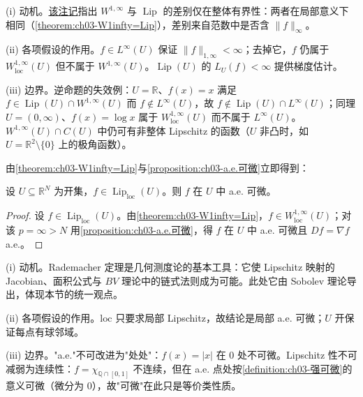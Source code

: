 \documentclass[../../main.tex]{subfiles}%
\begin{document}
\begin{remark}\label{remark:ch03-Lip含W1infty动机}
(i) 动机。\hyperref[remark:ch03-Lip含W1infty]{该注记}指出 $W^{1,\infty}$ 与 $\operatorname{Lip}$ 的差别仅在整体有界性：两者在局部意义下相同（\cref{theorem:ch03-W1infty=Lip}），差别来自范数中是否含 $\|f\|_\infty$。

(ii) 各项假设的作用。$f\in L^\infty(U)$ 保证 $\|f\|_{1,\infty}<\infty$；去掉它，$f$ 仍属于 $W^{1,\infty}_{\mathrm{loc}}(U)$ 但不属于 $W^{1,\infty}(U)$。$\operatorname{Lip}(U)$ 的 $L_U(f)<\infty$ 提供梯度估计。

(iii) 边界。逆命题的失效例：$U=\mathbb{R}$、$f(x)=x$ 满足 $f\in\operatorname{Lip}(U)\cap W^{1,\infty}(U)$ 而 $f\notin L^\infty(U)$，故 $f\notin\operatorname{Lip}(U)\cap L^\infty(U)$；同理 $U=(0,\infty)$、$f(x)=\log x$ 属于 $W^{1,\infty}_{\mathrm{loc}}(U)$ 而不属于 $L^\infty(U)$。$W^{1,\infty}(U)\cap C(U)$ 中仍可有非整体 Lipschitz 的函数（$U$ 非凸时，如 $U=\mathbb{R}^2\setminus\{0\}$ 上的极角函数）。
\end{remark}

由\cref{theorem:ch03-W1infty=Lip}与\cref{proposition:ch03-a.e.可微}立即得到：

\begin{corollary}[Rademacher]\label{corollary:ch03-Rademacher}
设 $U\subseteq\mathbb{R}^N$ 为开集，$f\in\operatorname{Lip}_{\mathrm{loc}}(U)$。则 $f$ 在 $U$ 中 a.e. 可微。
\end{corollary}

\begin{proof}
设 $f\in\operatorname{Lip}_{\mathrm{loc}}(U)$。由\cref{theorem:ch03-W1infty=Lip}，$f\in W^{1,\infty}_{\mathrm{loc}}(U)$；对该 $p=\infty>N$ 用\cref{proposition:ch03-a.e.可微}，得 $f$ 在 $U$ 中 a.e. 可微且 $Df=\nabla f$ a.e.。
\end{proof}

\begin{remark}\label{remark:ch03-Rademacher动机}
(i) 动机。Rademacher 定理是几何测度论的基本工具：它使 Lipschitz 映射的 Jacobian、面积公式与 $BV$ 理论中的链式法则成为可能。此处它由 Sobolev 理论导出，体现本节的统一观点。

(ii) 各项假设的作用。$\mathrm{loc}$ 只要求局部 Lipschitz，故结论是局部 a.e. 可微；$U$ 开保证每点有球邻域。

(iii) 边界。"a.e."不可改进为"处处"：$f(x)=|x|$ 在 $0$ 处不可微。Lipschitz 性不可减弱为连续性：$f=\chi_{\mathbb{Q}\cap[0,1]}$ 不连续，但在 a.e. 点处按\cref{definition:ch03-强可微}的意义可微（微分为 $0$），故"可微"在此只是等价类性质。
\end{remark}
\end{document}
